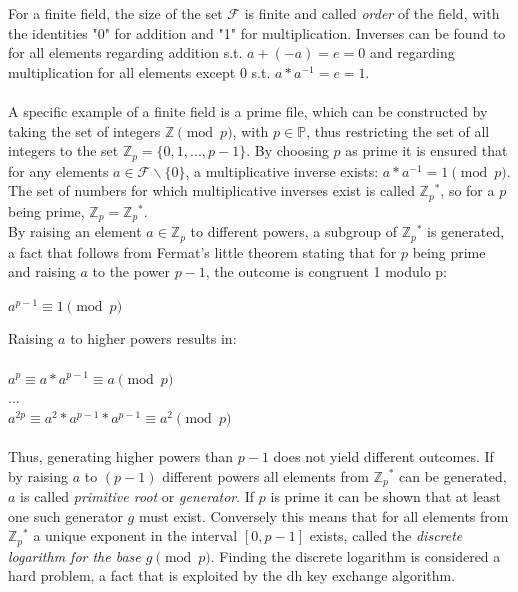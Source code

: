 For a finite field, the size of the set 
$\mathcal{F}$ is finite and called \textit{order} of the field, with the identities "0" for addition and "1" for
multiplication. Inverses can be found to for all
elements regarding addition s.t. $a + (-a) = e = 0$ and regarding multiplication for all elements except ${0}$ s.t. $a * a^{-1} = e = 1$.
\\
\\
A specific example of a finite field is a prime file, which can be constructed by taking the set of integers $\mathbb{Z}\pmod p$, with $p \in \mathbb{P}$, thus
restricting the set of all integers to the set $\mathbb{Z}_p = \{0, 1, ..., p-1\}$.
By choosing $p$ as prime it is ensured that for any elements $a \in \mathcal{F} \backslash\{0\}$, a multiplicative inverse exists: $ a * a^{-1} = 1 \pmod p$.
The set of numbers for which multiplicative inverses exist is called $\mathbb{Z}{_p}^*$, so for a $p$ being prime, $\mathbb{Z}_p = \mathbb{Z}{_p}^*$.
\\

By raising an element $a \in \mathbb{Z}_p$ to different powers, a subgroup of $\mathbb{Z}{_p}^*$
is generated, a fact that follows from Fermat's little theorem stating that for $p$ being prime and raising $a$ to the power $p-1$, the outcome is congruent 1
modulo p:
\begin{center}
 $a^{p-1} \equiv 1 \pmod p $ \\
\end{center}
Raising $a$ to higher powers results in:
\\
\\
 $a^{p} \equiv a*a^{p-1} \equiv a \pmod p$ \\
 ... \\
 $a^{2p} \equiv a^2 * a^{p-1} * a^{p-1} \equiv a^2 \pmod p$ 
\\
\\
Thus, generating higher powers than $p-1$ does not yield different outcomes. If by raising $a$ to $(p-1)$ different powers all elements from $\mathbb{Z}{_p}^*$ can
be generated, $a$ is called \textit{primitive root} or \textit{generator}.
If $p$ is prime it can be shown that at least one such generator $g$ must exist. Conversely this means that for
all elements from  $\mathbb{Z}{_p}^*$ a unique exponent in the interval $[0, p-1]$ exists, called the \textit{discrete logarithm for the base $ g \pmod p$}. Finding
the discrete logarithm is considered a hard problem, a fact that is exploited by the \gls{dh} key exchange algorithm.
\\


